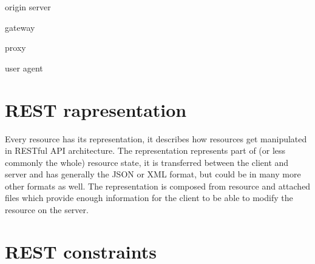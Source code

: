 \begin{description}
  \item origin server
  \item gateway
  \item proxy
  \item user agent
\end{description}


\section{REST rapresentation}
Every resource has its representation, it describes how resources get manipulated in RESTful  API architecture. The representation represents part of (or less commonly the whole) resource state, it is transferred between the client and server and has generally the JSON or XML format, but could be in many more other formats as well. The representation is composed from resource and attached files which provide enough information for the client to be able to modify the resource on the server.

\section{REST constraints}

